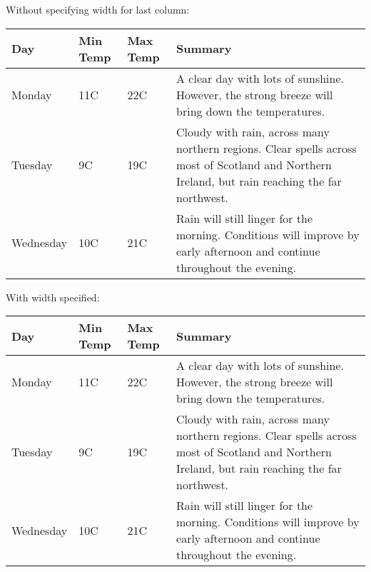 \documentclass{article}
\begin{document}
Without specifying width for last column:
  \begin{center}
\begin{tabular}{| l | l | l | l |}
\hline
Day & Min Temp & Max Temp & Summary \\ \hline
Monday & 11C & 22C & A clear day with lots of sunshine.
However, the strong breeze will bring down the temperatures. \\ \hline
Tuesday & 9C & 19C & Cloudy with rain, across many northern regions. Clear spells 
across most of Scotland and Northern Ireland, 
but rain reaching the far northwest. \\ \hline
Wednesday & 10C & 21C & Rain will still linger for the morning. 
Conditions will improve by early afternoon and continue 
throughout the evening. \\
\hline
\end{tabular}
\end{center}

With width specified:
  \begin{center}
\begin{tabular}{ | l | l | l | p{5cm} |}
\hline
Day & Min Temp & Max Temp & Summary \\ \hline
Monday & 11C & 22C & A clear day with lots of sunshine.  
However, the strong breeze will bring down the temperatures. \\ \hline
Tuesday & 9C & 19C & Cloudy with rain, across many northern regions. Clear spells 
across most of Scotland and Northern Ireland, 
but rain reaching the far northwest. \\ \hline
Wednesday & 10C & 21C & Rain will still linger for the morning. 
Conditions will improve by early afternoon and continue 
throughout the evening. \\
\hline
\end{tabular}
\end{center}
\end{document}
